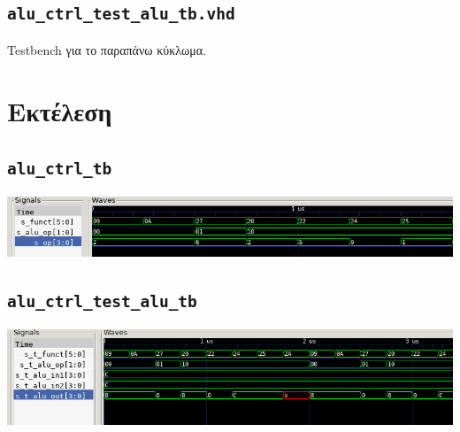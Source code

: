 \documentclass{article}
\begin{document}

\pagebreak

\subsection{\lstinline{alu_ctrl_test_alu_tb.vhd}}

Testbench για το παραπάνω κύκλωμα. \\


\pagebreak

\section{Εκτέλεση}

\subsection{\lstinline{alu_ctrl_tb}}
\includegraphics[width=\textwidth]{res/alu_ctrl.png}

\subsection{\lstinline{alu_ctrl_test_alu_tb}}
\includegraphics[width=\textwidth]{res/alu_ctrl_test_alu.png}
\end{document}
